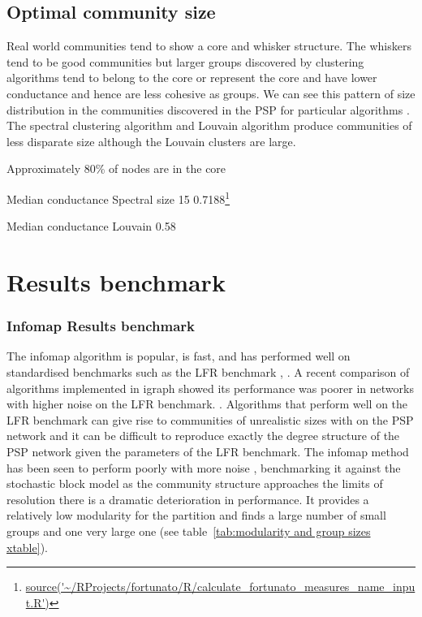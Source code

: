  




\subsection{Optimal community size}
\label{sec:optimal community size}
Real world communities tend to show a core and whisker structure. The whiskers tend to be good communities but larger groups discovered by clustering algorithms tend to belong to the core or represent the core and have lower conductance and hence are less cohesive as groups. We can see this pattern of size distribution in the communities discovered in the PSP for particular algorithms . The spectral clustering algorithm and Louvain algorithm produce communities of less disparate size although the Louvain clusters are large. 

Approximately 80\% of nodes are in the core 

\cite{leskovec2010empirical}

Median conductance Spectral size 15 0.7188\footnote{\url{source('~/RProjects/fortunato/R/calculate_fortunato_measures_name_input.R')}}

Median conductance Louvain 0.58 


\section{Results benchmark}

\subsubsection{Infomap Results benchmark}
The infomap algorithm is popular, is fast, and has performed well on standardised benchmarks such as the LFR benchmark \cite{lancichinetti2008benchmark}, \cite{newman2018networks}. A recent comparison of algorithms implemented in igraph\cite{yang2015defining} showed its performance was poorer in networks with higher noise on the LFR benchmark.  . Algorithms that perform well on the LFR benchmark can give rise to communities of unrealistic sizes with on the PSP network and it can be difficult to reproduce exactly the degree structure of the PSP network given the parameters of the LFR benchmark. The infomap method has been seen to perform poorly with more noise \cite{yang2016comparative}, benchmarking it against the stochastic block model as the community structure approaches the  limits of resolution there is a dramatic deterioration in performance. It provides a relatively low modularity for the partition and finds a large number of small groups and one very large one (see table~\ref{tab:modularity and group sizes xtable}). 



